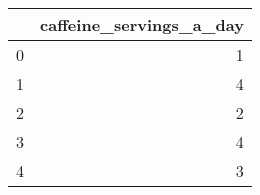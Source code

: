 \begin{tabular}{lr}
\toprule
{} &  caffeine\_servings\_a\_day \\
\midrule
0 &                        1 \\
1 &                        4 \\
2 &                        2 \\
3 &                        4 \\
4 &                        3 \\
\bottomrule
\end{tabular}
